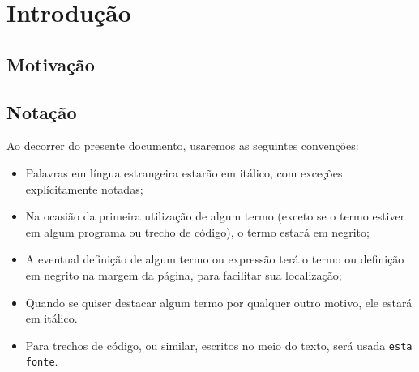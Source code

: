 \documentclass{article}
\theoremstyle{remark}
\begin{document}
\section{Introdução}

\subsection{Motivação}

\subsection{Notação}
  Ao decorrer do presente documento, usaremos as seguintes convenções:

  \begin{itemize}
    \item Palavras em língua estrangeira estarão em itálico, com exceções explícitamente notadas;
    \item Na ocasião da primeira utilização de algum termo (exceto se o termo estiver em algum programa ou trecho de código), o termo estará em negrito;
    \item A eventual definição de algum termo ou expressão terá o termo ou definição em negrito na margem da página, para facilitar sua localização;
    \item Quando se quiser destacar algum termo por qualquer outro motivo, ele estará em itálico.
    \item Para trechos de código, ou similar, escritos no meio do texto, será usada {\tt esta fonte}.
  \end{itemize}
\end{document}
